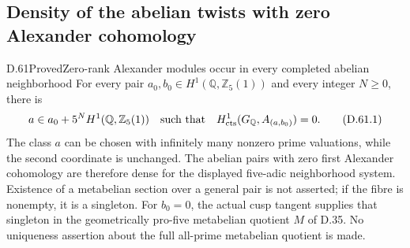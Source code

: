 \subsection{Density of the abelian twists with zero Alexander cohomology}

\begin{statement}{D.61}{Proved}{Zero-rank Alexander modules occur in every completed abelian neighborhood}
For every pair \(a_0,b_0\in H^1(\mathbb Q,\mathbb Z_5(1))\)
and every integer \(N\ge0\), there is
\[
 a\in a_0+5^N H^1(\mathbb Q,\mathbb Z_5(1))
 \quad\hbox{such that}\quad
 H^1_{\mathrm{cts}}(G_{\mathbb Q},A_{(a,b_0)})=0.
                                                        \tag{D.61.1}
\]
The class \(a\) can be chosen with infinitely many nonzero
prime valuations, while the second coordinate is unchanged.
The abelian pairs with zero first Alexander cohomology are
therefore dense for the displayed five-adic neighborhood
system. Existence of a metabelian section over a general
pair is not asserted; if the fibre is nonempty, it is a singleton.
For \(b_0=0\), the actual cusp tangent supplies that singleton
in the geometrically pro-five metabelian quotient \(M\) of
D.35. No uniqueness assertion about the full all-prime
metabelian quotient is made.
\end{statement}

